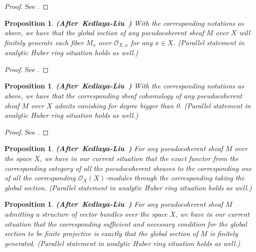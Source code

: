 \documentclass[12pt]{amsart}
\newtheorem{proposition}[theorem]{Proposition}
\theoremstyle{definition}
\numberwithin{equation}{section}
\begin{document}
\begin{proof}
See \cite[Theorem 2.6.5]{KL2}.	
\end{proof}


\begin{proposition}\mbox{\bf{(After Kedlaya-Liu \cite[Theorem 2.6.5]{KL2})}}
With the corresponding notations as above, we have that the global section of any pseudocoherent sheaf $M$ over $X$ will finitely generate each fiber $M_x$ over $\mathcal{O}_{X,x}$ for any $x\in X$. (Parallel statement in analytic Huber ring situation holds as well.)  
\end{proposition}


\begin{proof}
See \cite[Theorem 2.6.5]{KL2}.	
\end{proof}



\begin{proposition}\mbox{\bf{(After Kedlaya-Liu \cite[Theorem 2.6.5]{KL2})}}
With the corresponding notations as above, we have that the corresponding sheaf cohomology of any pseudocoherent sheaf $M$ over $X$ admits vanishing for degree bigger than 0. (Parallel statement in analytic Huber ring situation holds as well.)  
\end{proposition}


\begin{proof}
See \cite[Theorem 2.6.5]{KL2}.	
\end{proof}


\begin{proposition} \mbox{\bf{(After Kedlaya-Liu \cite[Corollary 2.6.6]{KL2})}}
For any pseudocoherent sheaf $M$ over the space $X$, we have in our current situation that the exact functor from the corresponding category of all the pseudocoherent sheaves to the corresponding one of all the corresponding $\mathcal{O}_X(X)$-modules through the corresponding taking the global section. (Parallel statement in analytic Huber ring situation holds as well.)  	
\end{proposition}


\begin{proposition}  \mbox{\bf{(After Kedlaya-Liu \cite[Corollary 2.6.8]{KL2})}}
For any pseudocoherent sheaf $M$ admitting a structure of vector bundles over the space $X$, we have in our current situation that the corresponding sufficient and necessary condition for the global section to be finite projective is exactly that the global section of $M$ is finitely generated. (Parallel statement in analytic Huber ring situation holds as well.)  	
\end{proposition}
\end{document}
